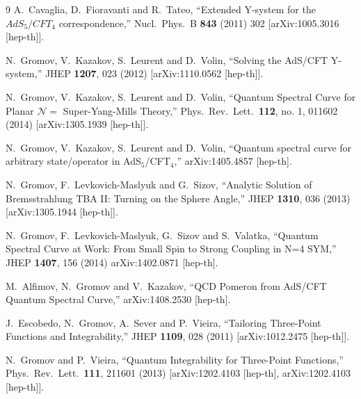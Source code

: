 \documentclass[a4paper,11pt]{article}
\numberwithin{equation}{section}
\begin{document}
\begin{thebibliography} {9}
  A.~Cavaglia, D.~Fioravanti and R.~Tateo,
  ``Extended Y-system for the $AdS_5/CFT_4$ correspondence,''
  Nucl.\ Phys.\ B {\bf 843} (2011) 302
  [arXiv:1005.3016 [hep-th]].

  N.~Gromov, V.~Kazakov, S.~Leurent and D.~Volin,
  ``Solving the AdS/CFT Y-system,''
  JHEP {\bf 1207}, 023 (2012)
  [arXiv:1110.0562 [hep-th]].

  N.~Gromov, V.~Kazakov, S.~Leurent and D.~Volin,
  ``Quantum Spectral Curve for Planar $\mathcal{N} =$ Super-Yang-Mills Theory,''
  Phys.\ Rev.\ Lett.\  {\bf 112}, no. 1, 011602 (2014)
  [arXiv:1305.1939 [hep-th]].

  N.~Gromov, V.~Kazakov, S.~Leurent and D.~Volin,
  ``Quantum spectral curve for arbitrary state/operator in AdS$_5$/CFT$_4$,''
  arXiv:1405.4857 [hep-th].

  N.~Gromov, F.~Levkovich-Maslyuk and G.~Sizov,
  ``Analytic Solution of Bremsstrahlung TBA II: Turning on the Sphere Angle,''
  JHEP {\bf 1310}, 036 (2013)
  [arXiv:1305.1944 [hep-th]].

  N.~Gromov, F.~Levkovich-Maslyuk, G.~Sizov and S.~Valatka,
  ``Quantum Spectral Curve at Work: From Small Spin to Strong Coupling in N=4 SYM,''
  JHEP {\bf 1407}, 156 (2014)
  arXiv:1402.0871 [hep-th].

  M.~Alfimov, N.~Gromov and V.~Kazakov,
  ``QCD Pomeron from AdS/CFT Quantum Spectral Curve,''
  arXiv:1408.2530 [hep-th].

  J.~Escobedo, N.~Gromov, A.~Sever and P.~Vieira,
  ``Tailoring Three-Point Functions and Integrability,''
  JHEP {\bf 1109}, 028 (2011)
  [arXiv:1012.2475 [hep-th]].

  N.~Gromov and P.~Vieira,
  ``Quantum Integrability for Three-Point Functions,''
  Phys.\ Rev.\ Lett.\  {\bf 111}, 211601 (2013)
  [arXiv:1202.4103 [hep-th], arXiv:1202.4103 [hep-th]].


\end{thebibliography}
\end{document}
